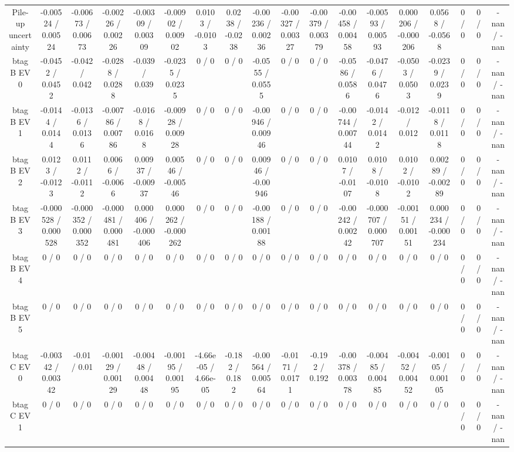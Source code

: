 \documentclass[10pt]{article}
\begin{document}
\begin{table}[htbp]
\begin{center}
\begin{tabular}{|c|c|c|c|c|c|c|c|c|c|c|c|c|c|c|c|c|c|}
  Pile-up uncertainty & -0.00524 / 0.00524 & -0.00673 / 0.00673 & -0.00226 / 0.00226 & -0.00309 / 0.00309 & -0.00902 / 0.00902 & 0.0103 / -0.0103 & 0.0238 / -0.0238 & -0.00236 / 0.00236 & -0.00327 / 0.00327 & -0.00379 / 0.00379 & -0.00458 / 0.00458 & -0.00593 / 0.00593 & 0.000206 / -0.000206 & 0.0568 / -0.0568 & 0 / 0 & 0 / 0 & -nan / -nan \\ 
  btag B EV 0 & -0.0452 / 0.0452 & -0.042 / 0.042 & -0.0288 / 0.0288 & -0.039 / 0.039 & -0.0235 / 0.0235 & 0 / 0 & 0 / 0 & -0.0555 / 0.0555 & 0 / 0 & 0 / 0 & -0.0586 / 0.0586 & -0.0476 / 0.0476 & -0.0503 / 0.0503 & -0.0239 / 0.0239 & 0 / 0 & 0 / 0 & -nan / -nan \\ 
  btag B EV 1 & -0.0144 / 0.0144 & -0.0136 / 0.0136 & -0.00786 / 0.00786 & -0.0168 / 0.0168 & -0.00928 / 0.00928 & 0 / 0 & 0 / 0 & -0.00946 / 0.00946 & 0 / 0 & 0 / 0 & -0.00744 / 0.00744 & -0.0142 / 0.0142 & -0.012 / 0.012 & -0.0118 / 0.0118 & 0 / 0 & 0 / 0 & -nan / -nan \\ 
  btag B EV 2 & 0.0123 / -0.0123 & 0.0112 / -0.0112 & 0.0066 / -0.0066 & 0.00937 / -0.00937 & 0.00546 / -0.00546 & 0 / 0 & 0 / 0 & 0.00946 / -0.00946 & 0 / 0 & 0 / 0 & 0.0107 / -0.0107 & 0.0108 / -0.0108 & 0.0102 / -0.0102 & 0.00289 / -0.00289 & 0 / 0 & 0 / 0 & -nan / -nan \\ 
  btag B EV 3 & -0.000528 / 0.000528 & -0.000352 / 0.000352 & -0.000481 / 0.000481 & 0.000406 / -0.000406 & 0.000262 / -0.000262 & 0 / 0 & 0 / 0 & -0.00188 / 0.00188 & 0 / 0 & 0 / 0 & -0.00242 / 0.00242 & -0.000707 / 0.000707 & -0.00151 / 0.00151 & 0.000234 / -0.000234 & 0 / 0 & 0 / 0 & -nan / -nan \\ 
  btag B EV 4 & 0 / 0 & 0 / 0 & 0 / 0 & 0 / 0 & 0 / 0 & 0 / 0 & 0 / 0 & 0 / 0 & 0 / 0 & 0 / 0 & 0 / 0 & 0 / 0 & 0 / 0 & 0 / 0 & 0 / 0 & 0 / 0 & -nan / -nan \\ 
  btag B EV 5 & 0 / 0 & 0 / 0 & 0 / 0 & 0 / 0 & 0 / 0 & 0 / 0 & 0 / 0 & 0 / 0 & 0 / 0 & 0 / 0 & 0 / 0 & 0 / 0 & 0 / 0 & 0 / 0 & 0 / 0 & 0 / 0 & -nan / -nan \\ 
  btag C EV 0 & -0.00342 / 0.00342 & -0.01 / 0.01 & -0.00129 / 0.00129 & -0.00448 / 0.00448 & -0.00195 / 0.00195 & -4.66e-05 / 4.66e-05 & -0.182 / 0.182 & -0.00564 / 0.00564 & -0.0171 / 0.0171 & -0.192 / 0.192 & -0.00378 / 0.00378 & -0.00485 / 0.00485 & -0.00452 / 0.00452 & -0.00105 / 0.00105 & 0 / 0 & 0 / 0 & -nan / -nan \\ 
  btag C EV 1 & 0 / 0 & 0 / 0 & 0 / 0 & 0 / 0 & 0 / 0 & 0 / 0 & 0 / 0 & 0 / 0 & 0 / 0 & 0 / 0 & 0 / 0 & 0 / 0 & 0 / 0 & 0 / 0 & 0 / 0 & 0 / 0 & -nan / -nan \\ 

\end{tabular}
\end{center}
\end{table}
\end{document}
